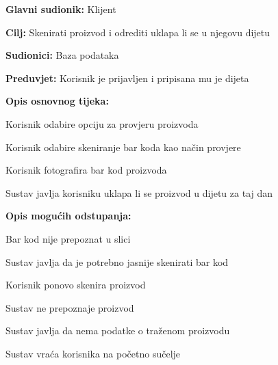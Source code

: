 					\noindent {}
					\begin{packed_item}
						
						\item \textbf{Glavni sudionik:} Klijent
						\item  \textbf{Cilj:} Skenirati proizvod i odrediti uklapa li se u njegovu dijetu
						\item  \textbf{Sudionici:} Baza podataka
						\item  \textbf{Preduvjet:} Korisnik je prijavljen i pripisana mu je dijeta
						\item  \textbf{Opis osnovnog tijeka:}
						
						\item[] \begin{packed_enum}
							
							\item Korisnik odabire opciju za provjeru proizvoda
							\item Korisnik odabire skeniranje bar koda kao način provjere
							\item Korisnik fotografira bar kod proizvoda
							\item Sustav javlja korisniku uklapa li se proizvod u dijetu za taj dan
							
						\end{packed_enum}
						
						\item  \textbf{Opis mogućih odstupanja:}
						
						\item[] \begin{packed_item}
							
							\item[2.a] Bar kod nije prepoznat u slici
							\item[] \begin{packed_enum}
								
								\item Sustav javlja da je potrebno jasnije skenirati bar kod
								\item Korisnik ponovo skenira proizvod
								
							\end{packed_enum}
						
							\item[2.b] Sustav ne prepoznaje proizvod
							\item[] \begin{packed_enum}
								
								\item Sustav javlja da nema podatke o traženom proizvodu
								\item Sustav vraća korisnika na početno sučelje
								
							\end{packed_enum}
							
						\end{packed_item}
						
					\end{packed_item}
				
